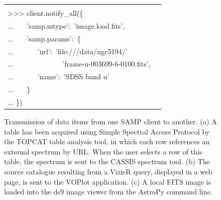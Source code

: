 \documentclass[5p]{elsarticle}
\begin{document}
\begin{figure}
\begin{center}
\begin{tabular}{lc}
\begin{picture}
{{{\begin{minipage}[b]{0cm}
\begin{tabbing}
{\color{lightgray}>>>} {\color{darkgray}client}.{\color{darkgray}connect}() \\
{\color{lightgray}>>>} {\color{darkgray}client}.{\color{darkgray}notify\_all}(\{ \\
{\color{lightgray}...} \ \ \ {\color{blue}'samp.mtype'}:\ {\color{blue}'image.load.fits'}, \\
{\color{lightgray}...} \ \ \ {\color{blue}'samp.params'}:\ \{ \\
{\color{lightgray}...} \ \ \ \ \ \ {\color{blue}'url'}:\ {\color{blue}'file:///data/ngc5194/'} \\
{\color{lightgray}...} \ \ \ \ \ \ \ \ \ \ \ \ \ {\color{blue}'frame-u-003699-6-0100.fits'}, \\
{\color{lightgray}...} \ \ \ \ \ \ {\color{blue}'name'}:\ {\color{blue}'SDSS band u'} \\
{\color{lightgray}...} \ \ \ \} \\
{\color{lightgray}...} \})
\end{tabbing}
\end{minipage}}}
\hspace*{2mm}
}
\end{picture}
\end{tabular}
\end{center}
\caption{\label{fig:transmit}
Transmission of data items from one SAMP client to another.
(a) A table has been acquired using Simple Spectral Access Protocol
by the TOPCAT table analysis tool, in which each row references
an external spectrum by URL.  When the user selects a row of this
table, the spectrum is sent to the CASSIS spectrum tool.
(b) The source catalogue resulting from a VizieR query,
displayed in a web page, is sent to the VOPlot application.
(c) A local FITS image is loaded into the ds9 image viewer
from the AstroPy command line.
}
\end{figure}
\end{document}
